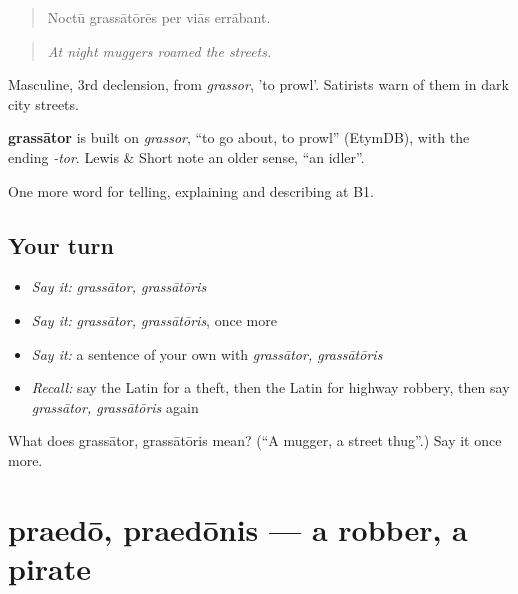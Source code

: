 \begin{quote}
Noctū grassātōrēs per viās errābant.
\end{quote}

\begin{quote}
\emph{At night muggers roamed the streets.}
\end{quote}

Masculine, 3rd declension, from \emph{grassor}, 'to prowl'. Satirists warn of them in dark city streets.

\begin{cousinweb}
\textbf{grassātor} is built on \emph{grassor}, \textquotedblleft{}to go about, to prowl\textquotedblright{} (EtymDB), with the ending \emph{-tor}. Lewis \& Short note an older sense, \textquotedblleft{}an idler\textquotedblright{}.
\end{cousinweb}

\begin{grammarlens}[title={What you've built}]
One more word for telling, explaining and describing at B1.
\end{grammarlens}

\subsection*{Your turn}
\begin{itemize}
\raggedright
  \item \emph{Say it:} \emph{grassātor, grassātōris}
  \item \emph{Say it:} \emph{grassātor, grassātōris}, once more
  \item \emph{Say it:} a sentence of your own with \emph{grassātor, grassātōris}
  \item \emph{Recall:} say the Latin for a theft, then the Latin for highway robbery, then say \emph{grassātor, grassātōris} again
\end{itemize}

\begin{tcolorbox}[breakable,colback=teal!4,colframe=teal!35!black,title={Before you move on}]
What does grassātor, grassātōris mean? (\textquotedblleft{}A mugger, a street thug\textquotedblright{}.) Say it once more.
\end{tcolorbox}
\section[praedō, praedōnis]{praedō, praedōnis — a robber, a pirate}

\label{lesson:LA-C303-praedo}



